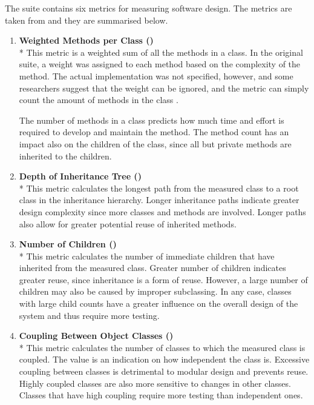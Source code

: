 The  suite contains six metrics for measuring software 
design. The metrics are taken from \citep{oodmetrics} and they are 
summarised below.

\begin{enumerate}

\item \textbf{Weighted Methods per Class ()}\\* This 
metric is a weighted sum of all the methods in a class. In the 
original  suite, a weight was assigned to each method based 
on the complexity of the method. The actual implementation was not 
specified, however, and some researchers suggest that the weight can 
be ignored, and the metric can simply count the amount of methods in 
the class \citep{ckanalysis}.

The number of methods in a class predicts how much time and effort is 
required to develop and maintain the method. The method count has an 
impact also on the children of the class, since all but private 
methods are inherited to the children.

\item \textbf{Depth of Inheritance Tree ()}\\* This metric 
calculates the longest path from the measured class to a root class in 
the inheritance hierarchy. Longer inheritance paths indicate greater 
design complexity since more classes and methods are involved. Longer 
paths also allow for greater potential reuse of inherited methods.

\item \textbf{Number of Children ()}\\* This metric 
calculates the number of immediate children that have inherited from 
the measured class. Greater number of children indicates greater 
reuse, since inheritance is a form of reuse. However, a large number 
of children may also be caused by improper subclassing. In any case, 
classes with large child counts have a greater influence on the 
overall design of the system and thus require more testing.

\item \textbf{Coupling Between Object Classes ()}\\* This 
metric calculates the number of classes to which the measured class is 
coupled. The value is an indication on how independent the class is. 
Excessive coupling between classes is detrimental to modular design 
and prevents reuse. Highly coupled classes are also more sensitive to 
changes in other classes. Classes that have high coupling require more 
testing than independent ones.


\end{enumerate}
